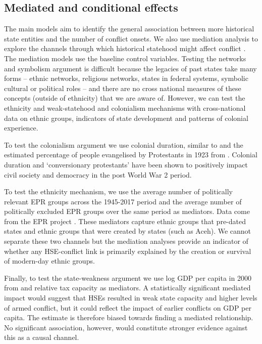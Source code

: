 \subsection{Mediated and conditional effects}

The main models aim to identify the general association between more historical
state entities and the number of conflict onsets. We also use mediation analysis
to explore the channels through which historical statehood might affect conflict
\citep{Imai2011}. The mediation models use the baseline control variables.
Testing the networks and symbolism argument is difficult because the legacies of
past states take many forms -- ethnic networks, religious networks, states in
federal systems, symbolic cultural or political roles -- and there are no cross
national measures of these concepts (outside of ethnicity) that we are aware of.
However, we can test the ethnicity and weak-statehood and colonialism mechanisms
with cross-national data on ethnic groups, indicators of state development and
patterns of colonial experience. 

To test the colonialism argument we use colonial duration, similar to
\citet{Hariri2012} and the estimated percentage of people evangelised by
Protestants in 1923 from \citet{Woodberry2012}. Colonial duration and
`conversionary protestants' have been shown to positively impact civil society
and democracy in the post World War 2 period. 

To test the ethnicity mechanism, we use the average number of politically
relevant EPR groups across the 1945-2017 period and the average number of
politically excluded EPR groups over the same period as mediators. Data come
from the EPR project \citep{Vogt2015}. These mediators capture ethnic groups
that pre-dated states and ethnic groups that were created by states (such as
Aceh). We cannot separate these two channels but the mediation analyses provide
an indicator of whether any HSE-conflict link is primarily explained by the
creation or survival of modern-day ethnic groups. 

Finally, to test the state-weakness argument we use log GDP per capita in 2000
from \citet{Acemoglu2001} and relative tax capacity \citep{Hendrix2010} as
mediators. A statistically significant mediated impact would suggest that HSEs
resulted in weak state capacity and higher levels of armed conflict, but it
could reflect the impact of earlier conflicts on GDP per capita. The estimate is
therefore biased towards finding a mediated relationship. No significant
association, however, would constitute stronger evidence against this as a
causal channel. 

